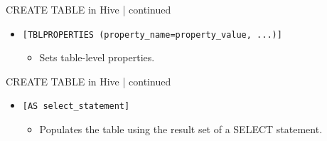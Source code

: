   \begin{frame}{CREATE TABLE in Hive | continued}
	\begin{tcolorbox}[colback=white,colframe=black,title= Part 9: Table Properties]
		\small
	\begin{itemize}
	  \item \texttt{[TBLPROPERTIES (property\_name=property\_value, ...)]}
	  \begin{itemize}
		\item Sets table-level properties.
	  \end{itemize}
	\end{itemize}
	\end{tcolorbox}
  \end{frame}
  
  \begin{frame}{CREATE TABLE in Hive | continued}
	\begin{tcolorbox}[colback=white,colframe=black,title= Part 10: CTAS]
		\small
	\begin{itemize}
	  \item \texttt{[AS select\_statement]}
	  \begin{itemize}
		\item Populates the table using the result set of a SELECT statement.
	  \end{itemize}
	\end{itemize}
	\end{tcolorbox}
  \end{frame}
   

